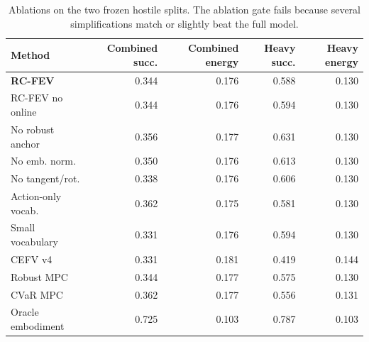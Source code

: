 \begin{table}[t]
\centering
\small
\caption{Ablations on the two frozen hostile splits. The ablation gate fails because several simplifications match or slightly beat the full model.}
\label{tab:ablations}
\begin{tabular}{lrrrr}
\toprule
Method & Combined succ. & Combined energy & Heavy succ. & Heavy energy \\
\midrule
\textbf{RC-FEV} & 0.344 & 0.176 & 0.588 & 0.130 \\
RC-FEV no online & 0.344 & 0.176 & 0.594 & 0.130 \\
No robust anchor & 0.356 & 0.177 & 0.631 & 0.130 \\
No emb. norm. & 0.350 & 0.176 & 0.613 & 0.130 \\
No tangent/rot. & 0.338 & 0.176 & 0.606 & 0.130 \\
Action-only vocab. & 0.362 & 0.175 & 0.581 & 0.130 \\
Small vocabulary & 0.331 & 0.176 & 0.594 & 0.130 \\
CEFV v4 & 0.331 & 0.181 & 0.419 & 0.144 \\
Robust MPC & 0.344 & 0.177 & 0.575 & 0.130 \\
CVaR MPC & 0.362 & 0.177 & 0.556 & 0.131 \\
Oracle embodiment & 0.725 & 0.103 & 0.787 & 0.103 \\
\bottomrule
\end{tabular}
\end{table}



